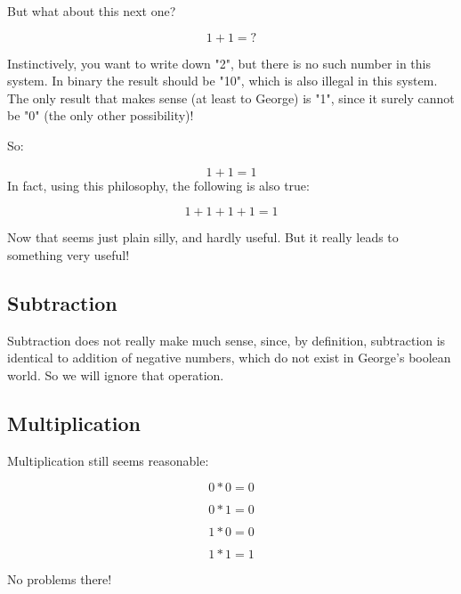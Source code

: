 But what
	about this next one?

\begin{equation}
    1 + 1 = ?
\end{equation}

Instinctively, you want to write down "2", but there is no such number in this
system. In binary the result should be "10", which is also
illegal in this system. The only result that makes sense (at least to George)
is "1", since it surely cannot be "0" (the only other possibility)!

So:

\begin{equation}
    1 + 1 = 1
\end{equation}
In fact, using this philosophy, the following is also true:

\begin{equation}
    1 + 1 + 1 + 1 = 1
\end{equation}

Now that seems just plain silly, and hardly useful. But it really leads to
something very useful!

\subsection{Subtraction}

Subtraction does not really make much sense, since, by definition, subtraction
is identical to addition of negative numbers, which do not exist in George's
boolean world. So we will ignore that operation.

\subsection{Multiplication}

Multiplication still seems reasonable:

\begin{equation}
    0 * 0 = 0
\end{equation}

\begin{equation}
    0 * 1 = 0
\end{equation}

\begin{equation}
    1 * 0 = 0
\end{equation}

\begin{equation}
    1 * 1 = 1
\end{equation}

No problems there!

